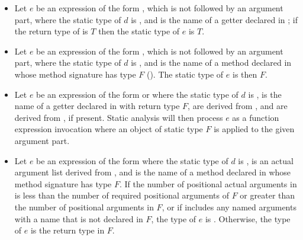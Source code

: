 \documentclass[makeidx]{article}
\begin{document}
{\begin{itemize}
\item
  Let $e$ be an expression of the form , which is not followed by an
  argument part, where the static type of $d$ is \DYNAMIC, and \id{} is the name of a
  getter declared in ; if the return type of  is $T$
  then the static type of $e$ is $T$.

\item
  Let $e$ be an expression of the form , which is not followed by an
  argument part, where the static type of $d$ is \DYNAMIC, and \id{} is the name of a
  method declared in  whose method signature has type $F$
  (). The static type of $e$ is then $F$.

\item
  Let $e$ be an expression of the form  or
  where the static type of $d$ is \DYNAMIC,
  \id{} is the name of a getter declared in  with return type $F$,
   are derived from , and
   are derived from , if present.
  Static analysis will then process $e$ as a function expression invocation
  where an object of static type $F$ is applied to the given argument part.

\item
  Let $e$ be an expression of the form 
  where the static type of $d$ is \DYNAMIC,  is
  an actual argument list derived from ,
  and \id{} is the name of a method declared in 
  whose method signature has type $F$.
  If the number of positional actual arguments in  is less than the
  number of required positional arguments of $F$ or greater than the number
  of positional arguments in $F$, or if  includes any named
  arguments with a name that is not declared in $F$, the type of $e$ is
  \DYNAMIC. Otherwise, the type of $e$ is the return type in $F$.


\end{itemize}}
\end{document}
